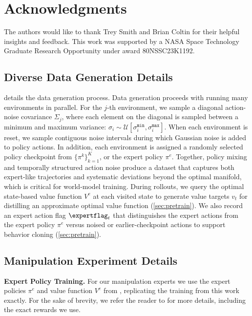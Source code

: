 \section*{Acknowledgments}
The authors would like to thank Trey Smith and Brian Coltin for their helpful insights and feedback. This work was supported by a NASA Space Technology Graduate Research Opportunity under award 80NSSC23K1192.




\appendix
{}

\subsection{Diverse Data Generation Details}
\label{app:datagendetails}
 details the data generation process. Data generation proceeds with running many environments in parallel. For the $j$-th environment, we sample a diagonal action-noise covariance $\Sigma_j$, where each element on the diagonal is sampled between a minimum and maximum variance: $\sigma_i \sim \mathcal{U}[\sigma^\mathtt{min}_i, \sigma^\mathtt{max}_i]$. When each environment is reset, we sample contiguous noise intervals during which Gaussian noise is added to policy actions. In addition, each environment is assigned a randomly selected policy checkpoint from $\{\pi^k\}_{k=1}^{K}$, or the expert policy $\pi^e$. Together, policy mixing and temporally structured action noise produce a dataset that captures both expert-like trajectories and systematic deviations beyond the optimal manifold, which is critical for  world-model training. During rollouts, we query the optimal state-based value function $V^e$ at each visited state to generate value targets $v_t$ for distilling an approximate optimal value function (\cref{sec:pretrain}). We also record an expert action flag $\expertflag_t$ that distinguishes the expert actions from the expert policy $\pi^e$ versus noised or earlier-checkpoint actions to support behavior cloning (\cref{sec:pretrain}).

\subsection{Manipulation Experiment Details}
\label{app:manip}
\textbf{Expert Policy Training.} For our manipulation experts we use the expert policies $\pi^e$ and value function $V^e$ from \cite{yin2026emergent}, replicating the training from this work exactly. For the sake of brevity, we refer the reader to \cite{yin2026emergent} for more details, including the exact rewards we use. 


